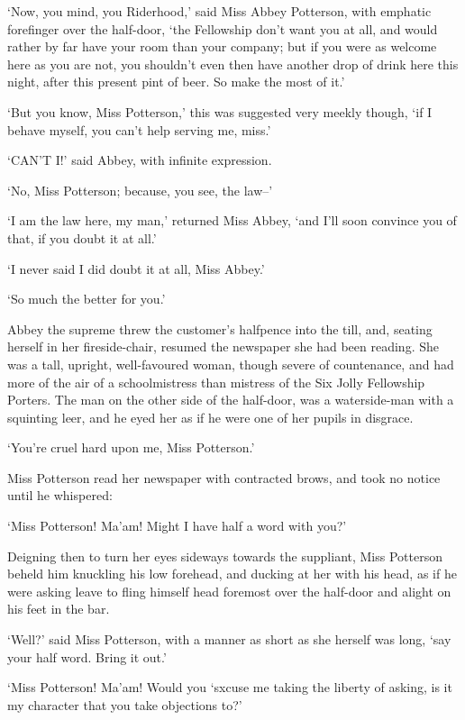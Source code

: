 ‘Now, you mind, you Riderhood,’ said Miss Abbey Potterson, with emphatic
forefinger over the half-door, ‘the Fellowship don’t want you at all,
and would rather by far have your room than your company; but if you
were as welcome here as you are not, you shouldn’t even then have
another drop of drink here this night, after this present pint of beer.
So make the most of it.’

‘But you know, Miss Potterson,’ this was suggested very meekly though,
‘if I behave myself, you can’t help serving me, miss.’

‘CAN’T I!’ said Abbey, with infinite expression.

‘No, Miss Potterson; because, you see, the law--’

‘I am the law here, my man,’ returned Miss Abbey, ‘and I’ll soon
convince you of that, if you doubt it at all.’

‘I never said I did doubt it at all, Miss Abbey.’

‘So much the better for you.’

Abbey the supreme threw the customer’s halfpence into the till, and,
seating herself in her fireside-chair, resumed the newspaper she had
been reading. She was a tall, upright, well-favoured woman, though
severe of countenance, and had more of the air of a schoolmistress than
mistress of the Six Jolly Fellowship Porters. The man on the other side
of the half-door, was a waterside-man with a squinting leer, and he eyed
her as if he were one of her pupils in disgrace.

‘You’re cruel hard upon me, Miss Potterson.’

Miss Potterson read her newspaper with contracted brows, and took no
notice until he whispered:

‘Miss Potterson! Ma’am! Might I have half a word with you?’

Deigning then to turn her eyes sideways towards the suppliant, Miss
Potterson beheld him knuckling his low forehead, and ducking at her with
his head, as if he were asking leave to fling himself head foremost over
the half-door and alight on his feet in the bar.

‘Well?’ said Miss Potterson, with a manner as short as she herself was
long, ‘say your half word. Bring it out.’

‘Miss Potterson! Ma’am! Would you ‘sxcuse me taking the liberty of
asking, is it my character that you take objections to?’

